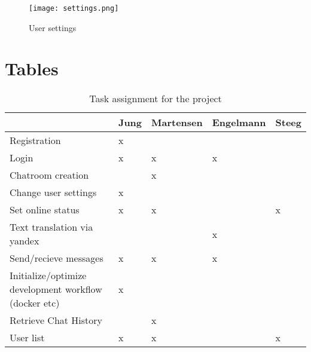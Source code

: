 \begin{figure}[!ht]
	\begin{center}
		\texttt{[image: settings.png]}
		\caption{User settings}
		\label{settings}
	\end{center}
\end{figure}

\FloatBarrier
\section{Tables}
\noindent
\renewcommand{\arraystretch}{1.5}
\renewcommand{\check}{x}
\FloatBarrier
\begin{table}[!htp]
	\begin{tabularx}{\textwidth}{p{}XXXX}
		
		& \textbf{Jung} & \textbf{Martensen} & \textbf{Engelmann} & \textbf{Steeg} \\\hline\hline
		Registration & \check & & &  \\ \hline
		Login & \check & \check & \check & \\\hline
		Chatroom creation & & \check & & \\\hline
		Change user settings &  \check & & & \\\hline
		Set online status & \check & \check & & \check\\\hline
		Text translation via yandex & & & \check & \\\hline
		Send/recieve messages & \check & \check & \check & \\\hline
		Initialize/optimize development workflow (docker etc) & \check & & & \\\hline
		Retrieve Chat History & & \check & & \\\hline
		User list & \check & \check & & \check \\\hline
	\end{tabularx}
	\caption{Task assignment for the project}\label{table:task-assignment}
\end{table}

